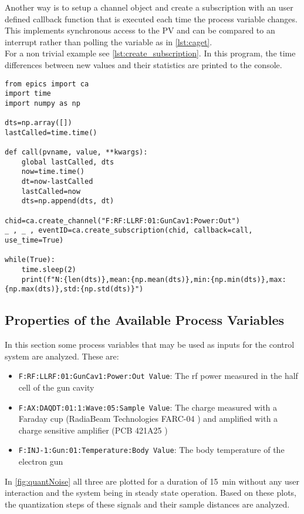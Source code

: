 Another way is to setup a channel object and create a subscription with an user defined callback function that is executed each time the process variable changes. This implements synchronous access to the PV and can be compared to an interrupt rather than polling the variable as in \autoref{lst:caget}.\\
For a non trivial example see \autoref{lst:create_subscription}. In this program, the time differences between new values and their statistics are printed to the console.

\begin{lstlisting}[style=python,caption = Using a user defined callback function to access an EPICS process value, label = lst:create_subscription]
from epics import ca
import time
import numpy as np

dts=np.array([])
lastCalled=time.time()

def call(pvname, value, **kwargs):
	global lastCalled, dts
	now=time.time()
	dt=now-lastCalled
	lastCalled=now
	dts=np.append(dts, dt)

chid=ca.create_channel("F:RF:LLRF:01:GunCav1:Power:Out")
_ , _ , eventID=ca.create_subscription(chid, callback=call, use_time=True)

while(True):
	time.sleep(2)
	print(f"N:{len(dts)},mean:{np.mean(dts)},min:{np.min(dts)},max:{np.max(dts)},std:{np.std(dts)}")
\end{lstlisting}




\subsection{Properties of the Available Process Variables}
In this section some process variables that may be used as inputs for the control system are analyzed. These are:
\begin{itemize}
\item \texttt{F:RF:LLRF:01:GunCav1:Power:Out Value}: The \gls{rf} power measured in the half cell of the gun cavity
\item \texttt{F:AX:DAQDT:01:1:Wave:05:Sample Value}: The charge measured with a Faraday cup (RadiaBeam Technologies FARC-04 \cite{radiabeamFaradayCups}) and amplified with a charge sensitive amplifier (PCB 421A25 \cite{pcbsynotechPCB421A25Charge})
\item \texttt{F:INJ-1:Gun:01:Temperature:Body Value}: The body temperature of the electron gun
\end{itemize}

In \autoref{fig:quantNoise} all three are plotted for a duration of \SI{15}{\minute} without any user interaction and the system being in steady state operation. Based on these plots, the quantization steps of these signals and their sample distances are analyzed.

